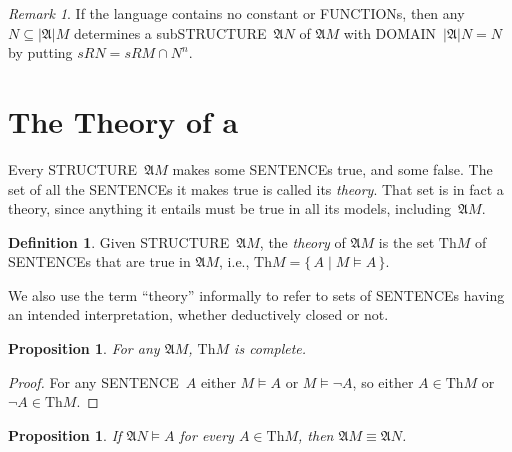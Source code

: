 \documentclass[10pt,a4paper]{article}
\newcommand*{\olup}[1]{\MakeUppercase{#1}}
\theoremstyle{plain}
\newtheorem{prop}[thm]{Proposition}
\theoremstyle{definition}
\newtheorem{defn}[thm]{Definition}
\theoremstyle{remark}
\newtheorem{rem}[thm]{Remark}
\newcommand*{\olfileid}[3]{}
\newcommand*{\ollabel}[1]{\label{#1}}
\providecommand{\Struct}{\ensuremath{\mathfrak{A}}}
\providecommand{\Domain}{\ensuremath{|\mathfrak{A}|}}
\providecommand{\Assign}{\ensuremath{s}}
\providecommand{\Sat}[2]{\ensuremath{#1 \models #2}}
\providecommand{\Setabs}[2]{\{\, #1 \mid #2 \,\}}
\providecommand{\elemequiv}{\mathrel{\equiv}}
\providecommand{\Theory}{\mathrm{Th}}
\begin{document}
\begin{rem}
\ollabel{rem:substructure}
If the language contains no constant or \olup{function}s, then any $N
\subseteq \Domain{M}$ determines a sub\olup{structure}~$\Struct{N}$ of
$\Struct M$ with \olup{domain}~$\Domain{N} = N$ by putting $\Assign{R}{N} =
\Assign{R}{M} \cap N^n$.
\end{rem}






\olfileid{mod}{bas}{thm}

\section{The Theory of a }

Every \olup{structure}~$\Struct{M}$ makes some \olup{sentence}s true, and
some false. The set of all the \olup{sentence}s it makes true is called
its \emph{theory}. That set is in fact a theory, since anything it
entails must be true in all its models, including~$\Struct{M}$.

\begin{defn}
  Given \olup{structure}~$\Struct M$, the \emph{theory} of
  $\Struct{M}$ is the set $\Theory{M}$ of \olup{sentence}s
  that are true in $\Struct{M}$, i.e., $\Theory{M} =
  \Setabs{A}{\Sat{M}{A}}$.
\end{defn}

We also use the term ``theory'' informally to refer to sets
of \olup{sentence}s having an intended interpretation, whether deductively
closed or not.

\begin{prop}
For any $\Struct{M}$, $\Theory{M}$ is complete.
\end{prop}

\begin{proof}
For any \olup{sentence}~$A$ either $\Sat{M}{A}$ or $\Sat{M}{\lnot A}$,
so either $A \in \Theory{M}$ or $\lnot A \in \Theory{M}$.
\end{proof}

\begin{prop}\ollabel{prop:equiv}
  If $\Struct{N} \models A$ for every $A \in \Theory{M}$, then
  $\Struct{M} \elemequiv \Struct{N}$.
\end{prop}
\end{document}
